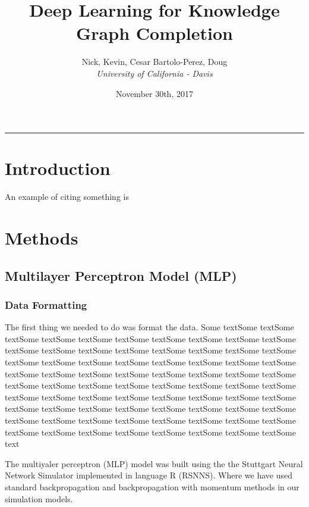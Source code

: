 \documentclass[11.5pt]{article}
\begin{document}
\title{Deep Learning for Knowledge Graph Completion}
\author{Nick, Kevin, Cesar Bartolo-Perez, Doug\\
	{\small\textit{University of California - Davis}}
} 
\date{November 30th, 2017}
\maketitle
\rule{\textwidth}{1pt}



\begin{abstract}

\end{abstract}

\tableofcontents


\section{Introduction}
An example of citing something is \cite{KosticFuso}



\section{Methods}
\subsection*{Multilayer Perceptron Model (MLP)}
\subsubsection{Data Formatting}
The first thing we needed to do was format the data. Some textSome textSome textSome textSome textSome textSome textSome textSome textSome textSome textSome textSome textSome textSome textSome textSome textSome textSome textSome textSome textSome textSome textSome textSome textSome textSome textSome textSome textSome textSome textSome textSome textSome textSome textSome textSome textSome textSome textSome textSome textSome textSome textSome textSome textSome textSome textSome textSome textSome textSome textSome textSome textSome textSome textSome textSome textSome textSome textSome textSome textSome textSome textSome textSome textSome textSome textSome textSome textSome textSome textSome textSome textSome textSome text

The multiyaler perceptron (MLP) model was built using the the Stuttgart Neural Network Simulator implemented in language R (RSNNS)\cite{RSNNS}. Where we have used standard backpropagation and backpropagation with momentum methods in our simulation models.
\end{document}
